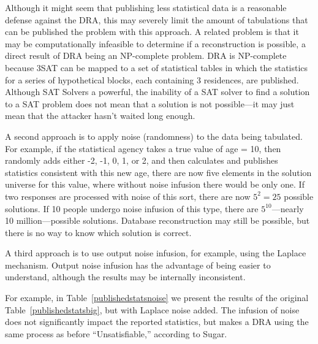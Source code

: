 \documentclass[runningheads]{llncs}
\begin{document}
Although it might seem that publishing less statistical data is a
reasonable defense against the DRA, this may severely limit the amount
of tabulations that can be published the problem with this approach. A
related problem is that it may be computationally infeasible to
determine if a reconstruction is possible, a direct result of DRA being an NP-complete
problem. DRA is NP-complete because 3SAT can be mapped to a set of
statistical tables in which the statistics for a series of
hypothetical blocks, each containing 3 residences, are
published. Although SAT Solvers a powerful, the inability of a SAT
solver to find a solution to a SAT problem does not mean that a
solution is not possible---it may just mean that the attacker hasn't waited
long enough.

A second approach is to apply noise (randomness) to the data being
tabulated. For example, if the statistical agency takes a true
value of age = 10, then randomly adds either -2, -1, 0, 1, or 2, and
then calculates and publishes statistics consistent with this new age,
there are now five elements in the solution universe for this value,
where without noise infusion there would be only one. If two responses
are processed with noise of this sort, there are now $5^2 = 25$
possible solutions. If 10 people undergo noise infusion of this type,
there are $5^{10}$---nearly 10 million---possible
solutions. Database reconstruction may still be possible, but there is no
way to know which solution is correct.

A third approach is to use output noise infusion, for example, using
the Laplace mechanism\cite{Dwork:2006:CNS:2180286.2180305}. Output
noise infusion has the advantage of being easier to understand,
although the results may be internally inconsistent.

For example, in Table~\ref{publishedstatsnoise} we present the results
of the original Table~\ref{publishedstatsbig}, but with Laplace noise
added.  The infusion of noise does not
significantly impact the reported statistics, but makes a DRA using
the same process as before ``Unsatisfiable,'' according to Sugar.
\end{document}
